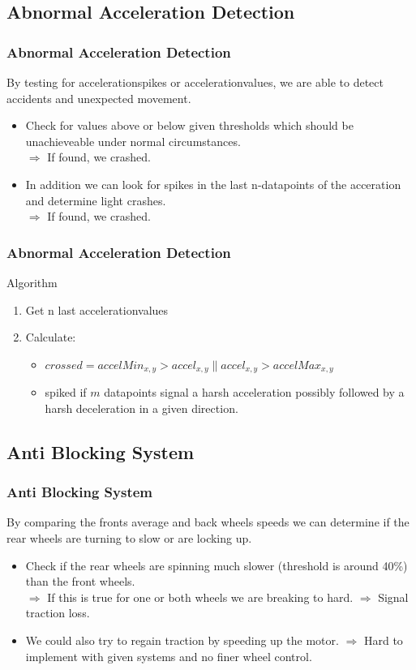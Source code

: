 \documentclass{beamer}
\begin{document}
\subsection{Abnormal Acceleration Detection}
\begin{frame}
    \frametitle{Abnormal Acceleration Detection}
    By testing for accelerationspikes or accelerationvalues, we are able to detect accidents and unexpected movement.\\
    \begin{itemize}
     \item Check for values above or below given thresholds which should be unachieveable under normal circumstances.\\
     $\Rightarrow$ If found, we crashed.
     \item In addition we can look for spikes in the last n-datapoints of the acceration and determine light crashes.\\
     $\Rightarrow$ If found, we crashed.
    \end{itemize}
\end{frame}
\begin{frame}
    \frametitle{Abnormal Acceleration Detection}
    Algorithm
    \begin{enumerate}
        \item Get n last accelerationvalues
        \item Calculate: 
        \begin{itemize}
            \item $crossed = accelMin_{x,y} > accel_{x,y} \parallel accel_{x,y} > accelMax_{x,y}$
            \item spiked if $m$ datapoints signal a harsh acceleration possibly followed by a harsh deceleration in a given direction.
        \end{itemize}
    \end{enumerate}
\end{frame}

\subsection{Anti Blocking System}
\begin{frame}
    \frametitle{Anti Blocking System}
    By comparing the fronts average and back wheels speeds we can determine if the rear wheels are turning to slow or are locking up. 
    \begin{itemize}
     \item Check if the rear wheels are spinning much slower (threshold is around 40\%) than the front wheels.\\
     $\Rightarrow$ If this is true for one or both wheels we are breaking to hard.
     $\Rightarrow$ Signal traction loss.
     \item We could also try to regain traction by speeding up the motor. 
     $\Rightarrow$ Hard to implement with given systems and no finer wheel control. \\
    \end{itemize}
\end{frame}
\end{document}
